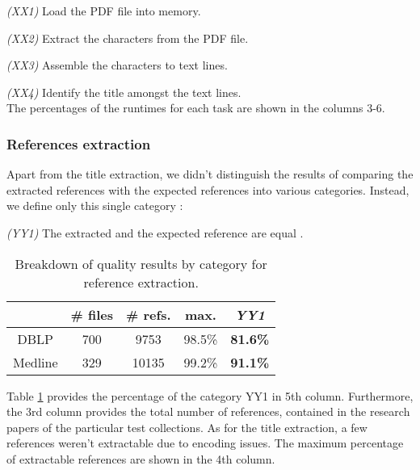 \par\medskip\noindent
\textit{(XX1)} Load the PDF file into memory.
\par\medskip\noindent
\textit{(XX2)} Extract the characters from the PDF file.
\par\medskip\noindent
\textit{(XX3)} Assemble the characters to text lines. 
\par\medskip\noindent
\textit{(XX4)} Identify the title amongst the text lines.
\medskip \\
The percentages of the runtimes for each task are shown in the columns 3-6. 

\subsubsection{References extraction} 
Apart from the title extraction, we didn't distinguish the results of comparing the extracted references with the expected references into various categories. Instead, we define only this single category :

\par\medskip\noindent
\textit{(YY1)} The extracted and the expected reference are equal .
\medskip \\

\vspace{-1mm}
\begin{table}[ht]
\centering
{\renewcommand{\baselinestretch}{1.3}\normalsize
\hspace*{-2.5mm}
\begin{tabular}{|c|c|c|c||c|} \hline 
        & \# files  & \# refs.      &  max.      & \textit{YY1} \\ \hline
DBLP    & 700 & 9753  & 98.5\% & \textbf{81.6\%} \\
Medline & 329 & 10135 & 99.2\% & \textbf{91.1\%} \\ \hline
\end{tabular}}
\vspace{-3mm}
\caption{Breakdown of quality results by category for reference extraction.}
\label{table:references-extraction-quality}
\vspace{-2mm}
\end{table}

Table \ref{table:references-extraction-quality} provides the percentage of the category YY1 in 5th column. Furthermore, the 3rd column provides the total number of references, contained in the research papers of the particular test collections. As for the title extraction, a few references weren't extractable due to encoding issues. The maximum percentage of extractable references are shown in the 4th column.


